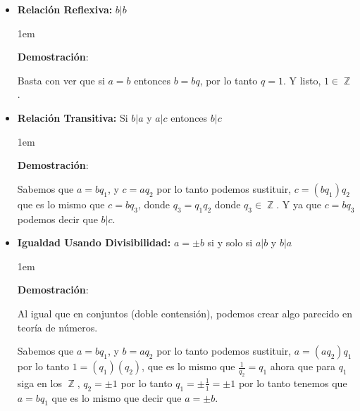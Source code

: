 \documentclass[12pt, fleqn]{report}                             %
\newenvironment{SmallIndentation}[1][0.75em]                    %
    {\begin{adjustwidth}{#1}{}\begin{footnotesize}}                 %
    {\end{footnotesize}\end{adjustwidth}}                           %
\DeclareMathOperator \Integers  {\mathbb{Z}}                     %
\begin{document}
            \begin{itemize}

                \item \textbf{Relación Reflexiva:} $b|b$

                    \begin{SmallIndentation}[1em]
                        \textbf{Demostración}:

                        Basta con ver que si $a = b$ entonces $b = bq$, por lo tanto $q = 1$.
                        Y listo, $1 \in \Integers$.

                    \end{SmallIndentation}

                \item \textbf{Relación Transitiva:} Si $b|a$ y $a|c$ entonces $b|c$

                    \begin{SmallIndentation}[1em]
                        \textbf{Demostración}:

                        Sabemos que $a=bq_1$, y $c=aq_2$ por lo tanto podemos sustituir, 
                        $c=(bq_1)q_2$ que es lo mismo que $c=bq_3$, donde $q_3 = q_1q_2$
                        donde $q_3 \in \Integers$. 
                        Y ya que $c=bq_3$ podemos decir que $b|c$.

                    \end{SmallIndentation}



                \item \textbf{Igualdad Usando Divisibilidad:} $a = \pm b$ si y solo si $a|b$ y $b|a$

                    \begin{SmallIndentation}[1em]
                        \textbf{Demostración}:


                            Al igual que en conjuntos (doble contensión), podemos crear algo parecido en
                            teoría de números.

                            Sabemos que $a=bq_1$, y $b=aq_2$ por lo tanto podemos sustituir, 
                            $a=(aq_2)q_1$ por lo tanto $1=(q_1)(q_2)$, que es lo mismo que
                            $\frac{1}{q_2}=q_1$ ahora que para $q_1$ siga en los $\Integers$,
                            $q_2 = \pm 1$ por lo tanto $q_1 = \pm \frac{1}{1} = \pm 1$ por
                            lo tanto tenemos que $a = bq_1$ que es lo mismo que decir que $a = \pm b$.


\end{SmallIndentation}
\end{itemize}
\end{document}
